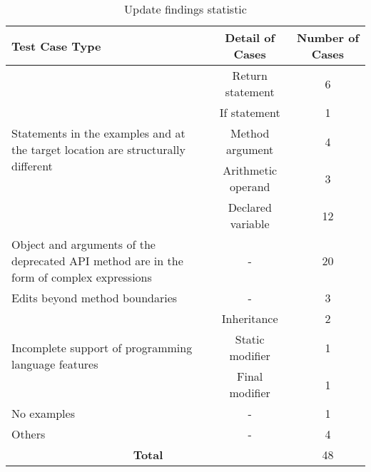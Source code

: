 \begin{table}
\caption{Update findings statistic}
\begin{center}
\begin{tabular}{ | p{8em} |c|c| } 
 \hline
 \textbf{Test Case Type} & \textbf{Detail of Cases} & \textbf{Number of Cases} \\ 
 \hline
 \multirow{5}{8em}{Statements in the examples and at the target location are structurally different} & Return statement & 6 \\\cline{2-3} & If statement & 1 \\\cline{2-3} & Method argument & 4 \\\cline{2-3} & Arithmetic operand & 3 \\\cline{2-3}  & Declared variable & 12 \\\cline{2-3} 
 \hline
  Object and arguments of the deprecated API method are in the form of complex expressions & - & 20\\
 \hline
 Edits beyond method boundaries & - & 3\\
\hline
 \multirow{3}{8em}{Incomplete support of programming language features} & Inheritance & 2\\\cline{2-3} & Static modifier & 1 \\\cline{2-3} & Final modifier & 1\\\cline{2-3}
 \hline
 No examples & - & 1\\
 \hline
 Others & - & 4\\
 \hline
 \multicolumn{2}{|c|}{\bf Total} & 48\\
 \hline
\end{tabular}
\end{center}
\label{table:data_statistic}
\end{table}

